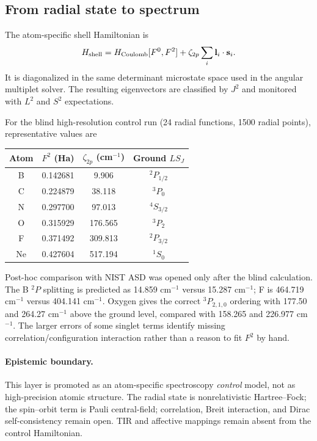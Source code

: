 \subsection{From radial state to spectrum}

The atom-specific shell Hamiltonian is
\begin{equation}
 H_{\rm shell}=H_{\rm Coulomb}[F^0,F^2]+\zeta_{2p}\sum_i \mathbf l_i\cdot\mathbf s_i.
\end{equation}
It is diagonalized in the same determinant microstate space used in the angular multiplet solver.  The resulting eigenvectors are classified by $J^2$ and monitored with $L^2$ and $S^2$ expectations.

For the blind high-resolution control run (24 radial functions, 1500 radial points), representative values are
\begin{center}
\begin{tabular}{c|c|c|c}
Atom & $F^2$ (Ha) & $\zeta_{2p}$ (cm$^{-1}$) & Ground $LS_J$\\ \hline
B & 0.142681 & 9.906 & $^2P_{1/2}$\\
C & 0.224879 & 38.118 & $^3P_0$\\
N & 0.297700 & 97.013 & $^4S_{3/2}$\\
O & 0.315929 & 176.565 & $^3P_2$\\
F & 0.371492 & 309.813 & $^2P_{3/2}$\\
Ne & 0.427604 & 517.194 & $^1S_0$
\end{tabular}
\end{center}

Post-hoc comparison with NIST ASD was opened only after the blind calculation.  The B $^2P$ splitting is predicted as 14.859 cm$^{-1}$ versus 15.287 cm$^{-1}$; F is 464.719 cm$^{-1}$ versus 404.141 cm$^{-1}$.  Oxygen gives the correct $^3P_{2,1,0}$ ordering with 177.50 and 264.27 cm$^{-1}$ above the ground level, compared with 158.265 and 226.977 cm$^{-1}$.  The larger errors of some singlet terms identify missing correlation/configuration interaction rather than a reason to fit $F^2$ by hand.

\paragraph{Epistemic boundary.}
This layer is promoted as an atom-specific spectroscopy \emph{control} model, not as high-precision atomic structure.  The radial state is nonrelativistic Hartree--Fock; the spin--orbit term is Pauli central-field; correlation, Breit interaction, and Dirac self-consistency remain open.  TIR and affective mappings remain absent from the control Hamiltonian.
